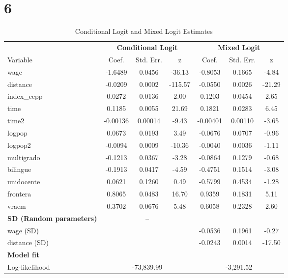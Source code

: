 \documentclass{article}
\begin{document}
\section{6}
\begin{table}[H]
\centering
\caption{Conditional Logit and Mixed Logit Estimates}
\label{tab:clogit_mixlogit}
\begin{threeparttable}
\begin{tabular}{lcccccc}
\toprule
 & \multicolumn{3}{c}{\textbf{Conditional Logit}} & \multicolumn{3}{c}{\textbf{Mixed Logit}} \\
\cmidrule(lr){2-4} \cmidrule(lr){5-7}
Variable & Coef. & Std. Err. & z & Coef. & Std. Err. & z \\
\midrule
wage            & -1.6489  & 0.0456 & -36.13 & -0.8053  & 0.1665 & -4.84 \\
distance        & -0.0209  & 0.0002 & -115.57 & -0.0550  & 0.0026 & -21.29 \\
index\_ccpp     &  0.0272  & 0.0136 & 2.00 &  0.1203  & 0.0454 & 2.65 \\
time            &  0.1185  & 0.0055 & 21.69 &  0.1821  & 0.0283 & 6.45 \\
time2           & -0.00136 & 0.00014 & -9.43 & -0.00401 & 0.00110 & -3.65 \\
logpop          &  0.0673  & 0.0193 & 3.49 & -0.0676  & 0.0707 & -0.96 \\
logpop2         & -0.0094  & 0.0009 & -10.36 & -0.0040  & 0.0036 & -1.11 \\
multigrado      & -0.1213  & 0.0367 & -3.28 & -0.0864  & 0.1279 & -0.68 \\
bilingue        & -0.1913  & 0.0417 & -4.59 & -0.4751  & 0.1514 & -3.08 \\
unidocente      &  0.0621  & 0.1260 & 0.49  & -0.5799  & 0.4534 & -1.28 \\
frontera        &  0.8065  & 0.0483 & 16.70 &  0.9359  & 0.1831 & 5.11 \\
vraem           &  0.3702  & 0.0676 & 5.48  &  0.6058  & 0.2328 & 2.60 \\
\midrule
\textbf{SD (Random parameters)} & \multicolumn{3}{c}{--} & & & \\
wage (SD)       &  &  &  & -0.0536 & 0.1961 & -0.27 \\
distance (SD)   &  &  &  & -0.0243 & 0.0014 & -17.50 \\
\midrule
\textbf{Model fit} & & & & & & \\
Log-likelihood     & \multicolumn{3}{c}{-73,839.99} & \multicolumn{3}{c}{-3,291.52} \\

\end{tabular}
\end{threeparttable}
\end{table}
\end{document}
